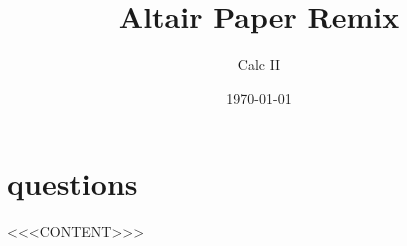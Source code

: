 \documentclass[a4paper,12pt]{article}
\title{Altair Paper Remix}
\author{Calc II}
\date{\today}
\begin{document}
\maketitle

\section{questions}

<<<CONTENT>>>
\end{document}
